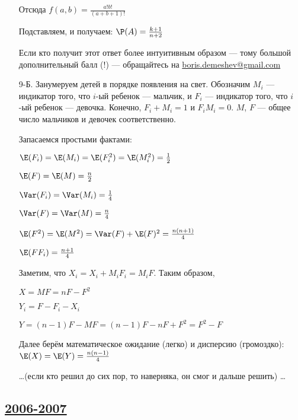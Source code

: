 \begin{enumerate}
Отсюда $f(a,b)=\frac{a!b!}{(a+b+1)!}$

Подставляем, и получаем: $\P(A)=\frac{k+1}{n+2}$

Если кто получит этот ответ более интуитивным образом — тому большой
дополнительный балл (!) — обращайтесь на \href{mailto:boris.demeshev@gmail.com}{boris.demeshev@gmail.com}

\item[9-Б.] Занумеруем детей в порядке появления на свет. Обозначим $M_{i}$ —
индикатор того, что $i$-ый ребенок — мальчик, и $F_{i}$ — индикатор того, что
$i$-ый ребенок — девочка. Конечно, $F_{i}+M_{i}=1$ и $F_{i}M_{i}=0$.
$M$, $F$ — общее число мальчиков и девочек соответственно.

Запасаемся простыми фактами:

$\E(F_{i})=\E(M_{i})=\E(F_{i}^{2})=\E(M_{i}^{2})=\frac{1}{2}$

$\E(F)=\E(M)=\frac{n}{2}$

$\Var(F_{i})=\Var(M_{i})=\frac{1}{4}$

$\Var(F)=\Var(M)=\frac{n}{4}$

$\E(F^{2})=\E(M^{2})=\Var(F)+\E(F)^{2}=\frac{n(n+1)}{4}$

$\E(FF_{i})=\frac{n+1}{4}$

Заметим, что $X_{i}=X_{i}+M_{i}F_{i}=M_{i}F$. Таким образом,

$X=MF=nF-F^{2}$

$Y_{i}=F-F_{i}-X_{i}$

$Y=(n-1)F-MF=(n-1)F-nF+F^{2}=F^{2}-F$

Далее берём математическое ожидание (легко) и дисперсию (громоздко):  $\E(X)=\E(Y)=\frac{n(n-1)}{4}$

\ldots (если кто решил до сих пор, то наверняка, он смог и дальше решить) \ldots
\end{enumerate}



\subsection[2006-2007]{\hyperref[sec:kr_01_2006_2007]{2006-2007}}
\label{sec:sol_kr_01_2006_2007}

